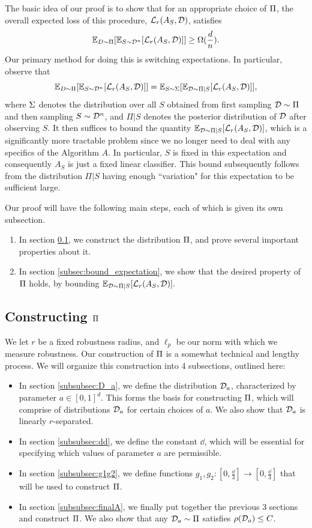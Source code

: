 The basic idea of our proof is to show that for an appropriate choice of $\Pi$, the overall expected loss of this procedure, $\mathcal L_r(A_S, {\mathcal D})$, satisfies  $${\mathbb E}_{D \sim \Pi}[{\mathbb E}_{S \sim {\mathcal D}^n}[\mathcal L_r(A_S, {\mathcal D})]] \geq \Omega(\frac{d}{n}).$$ Our primary method for doing this is switching expectations. In particular, observe that $${\mathbb E}_{D \sim \Pi}[{\mathbb E}_{S \sim {\mathcal D}^n}[\mathcal L_r(A_S, {\mathcal D})]] = {\mathbb E}_{S \sim \Sigma}[{\mathbb E}_{{\mathcal D} \sim \Pi|S}[\mathcal L_r(A_S, {\mathcal D})]],$$ where $\Sigma$ denotes the distribution over all $S$ obtained from first sampling ${\mathcal D} \sim \Pi$ and then sampling $S \sim {\mathcal D}^n$, and $\Pi|S$ denotes the posterior distribution of ${\mathcal D}$ after observing $S$. It then suffices to bound the quantity ${\mathbb E}_{{\mathcal D} \sim \Pi|S}[\mathcal L_r(A_S, {\mathcal D})]$, which is a significantly more tractable problem since we no longer need to deal with any specifics of the Algorithm $A$. In particular, $S$ is fixed in this expectation and consequently $A_S$ is just a fixed linear classifier. This bound subsequently follows from the distribution $\Pi|S$ having enough ``variation" for this expectation to be sufficient large. 

Our proof will have the following main steps, each of which is given its own subsection.

\begin{enumerate}
	\item In section \ref{subsec:constructing_A}, we construct the distribution $\Pi$, and prove several important properties about it. 
	\item In section \ref{subsec:bound_expectation}, we show that the desired property of $\Pi$ holds, by bounding ${\mathbb E}_{{\mathcal D} \sim \Pi|S}[\mathcal L_r(A_S, {\mathcal D})].$
\end{enumerate}


\subsection{Constructing $\Pi$}\label{subsec:constructing_A}

We let $r$ be a fixed robustness radius, and $\ell_p$ be our norm with which we measure robustness. Our construction of $\Pi$ is a somewhat technical and lengthy process. We will organize this construction into 4 subsections, outlined here:
\begin{itemize}
	\item In section \ref{subsubsec:D_a}, we define the distribution ${\mathcal D}_a$, characterized by parameter $a \in [0,1]^d$. This forms the basis for constructing $\Pi$, which will comprise of distributions ${\mathcal D}_a$ for certain choices of $a$. We also show that ${\mathcal D}_a$ is linearly $r$-separated.
	\item In section \ref{subsubsec:dd}, we define the constant $\dd$, which will be essential for specifying which values of parameter $a$ are permissible. 
	\item In section \ref{subsubsec:g1g2}, we define functions $g_1, g_2: [0, \frac{\dd}{3}] \to [0, \frac{\dd}{3}]$ that will be used to construct $\Pi$. 
	\item In section \ref{subsubsec:finalA}, we finally put together the previous 3 sections and construct $\Pi$. We also show that any ${\mathcal D}_a \sim \Pi$ satisfies $\rho({\mathcal D}_a) \leq C$. 
\end{itemize}


